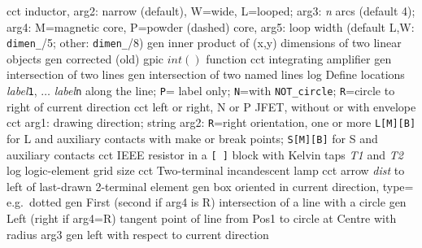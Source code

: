   {cct}
  {inductor, arg2: narrow (default), W=wide, L=looped;
   arg3: {\sl n} arcs (default 4);
   arg4: M=magnetic core, P=powder (dashed) core,
   arg5: loop width (default L,W: {\tt dimen\_}/5; other: {\tt dimen\_}/8)
   }
  {gen}
  {inner product of (x,y) dimensions of two linear objects}
  {gen}
  {corrected (old) gpic $int()$ function}
  {cct}
  {integrating amplifier}
  {gen}
  {intersection of two lines}
  {gen}
  {intersection of two named lines}
  {log}
  {Define locations {\sl label}{\tt 1}, $\ldots$ {\sl label}{\tt n}
    along the line; {\tt P}= label only;
    {\tt N}=with {\tt NOT\_circle};
    {\tt R}=circle to right of current direction }
  {cct}
  {left or right, N or P JFET, without or with envelope
    }
  {cct}
  {arg1: drawing direction; string arg2: {\tt R}=right orientation,
   one or more {\tt L[M][B]} for L and auxiliary contacts with make or break
   points; {\tt S[M][B]} for S and auxiliary contacts
   }
  {cct}
  {IEEE resistor in a {\tt [ ]} block with Kelvin taps {\sl T1} and {\sl T2}
   }
  {log}
  {logic-element grid size}
  {cct}
  {Two-terminal incandescent lamp
   }
  {cct}
  {arrow {\sl dist} to left of last-drawn 2-terminal element
   }
  {gen}
  {box oriented in current direction, type= e.g.\ dotted}
  {gen}
  { First (second if arg4 is R) intersection of a line with a circle}
  {gen}
  { Left (right if arg4=R) tangent point of line
     from Pos1 to circle at Centre with radius arg3}
  {gen}
  {left with respect to current direction }
